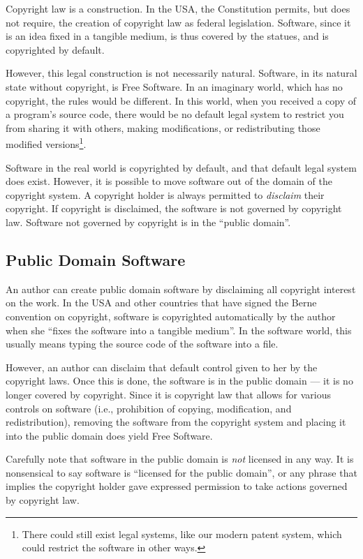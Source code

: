 \documentclass[12pt]{report}
\newcommand{\defn}[1]{\emph{#1}}
\begin{document}
Copyright law is a construction.  In the USA, the Constitution permits,
but does not require, the creation of copyright law as federal
legislation.  Software, since it is an idea fixed in a tangible medium, is
thus covered by the statues, and is copyrighted by default.

However, this legal construction is not necessarily natural.  Software, in
its natural state without copyright, is Free Software.  In an imaginary
world, which has no copyright, the rules would be different.  In this
world, when you received a copy of a program's source code, there would be
no default legal system to restrict you from sharing it with others,
making modifications, or redistributing those modified
versions\footnote{There could still exist legal systems, like our modern
  patent system, which could restrict the software in other ways.}.

Software in the real world is copyrighted by default, and that default
legal system does exist.  However, it is possible to move software out of
the domain of the copyright system.  A copyright holder is always
permitted to \defn{disclaim} their copyright.  If copyright is disclaimed,
the software is not governed by copyright law.  Software not governed by
copyright is in the ``public domain''.

\subsection{Public Domain Software}

An author can create public domain software by disclaiming all copyright
interest on the work.  In the USA and other countries that have signed the
Berne convention on copyright, software is copyrighted automatically by
the author when she ``fixes the software into a tangible medium''.  In
the software world, this usually means typing the source code of the
software into a file.

However, an author can disclaim that default control given to her by the
copyright laws.  Once this is done, the software is in the public domain
--- it is no longer covered by copyright.  Since it is copyright law that
allows for various controls on software (i.e., prohibition of copying,
modification, and redistribution), removing the software from the
copyright system and placing it into the public domain does yield Free
Software.

Carefully note that software in the public domain is \emph{not} licensed
in any way.  It is nonsensical to say software is ``licensed for the
public domain'', or any phrase that implies the copyright holder gave
expressed permission to take actions governed by copyright law.
\end{document}
